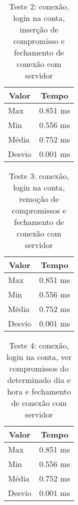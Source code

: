 \documentclass[10pt,a4paper]{article}
\begin{document}
\begin{table}[h!]
\caption{Teste 2: conexão, login na conta, inserção de compromisso e fechamento de conexão com servidor}
\begin{center}
  \begin{tabular}{lr}
    \multicolumn{1}{c}{Valor} & \multicolumn{1}{c}{Tempo}\\
    \hline
    Max & 0.851 ms\\
    Min & 0.556 ms\\
    Média & 0.752 ms \\
    Desvio & 0.001 ms
  \end{tabular}

\end{center}
\end{table}


\begin{table}[h!]
\caption{Teste 3: conexão, login na conta, remoção de compromissos
  e fechamento de conexão com servidor}
\begin{center}
  \begin{tabular}{lr}
    \multicolumn{1}{c}{Valor} & \multicolumn{1}{c}{Tempo}\\
    \hline
    Max & 0.851 ms\\
    Min & 0.556 ms\\
    Média & 0.752 ms \\
    Desvio & 0.001 ms
  \end{tabular}

\end{center}
\end{table}

\begin{table}[h!]
\caption{Teste 4: conexão, login na conta, ver compromissos do
  determinado dia e hora e fechamento de conexão com servidor}
\begin{center}
  \begin{tabular}{lr}
    \multicolumn{1}{c}{Valor} & \multicolumn{1}{c}{Tempo}\\
    \hline
    Max & 0.851 ms\\
    Min & 0.556 ms\\
    Média & 0.752 ms \\
    Desvio & 0.001 ms
  \end{tabular}

\end{center}
\end{table}
\end{document}
